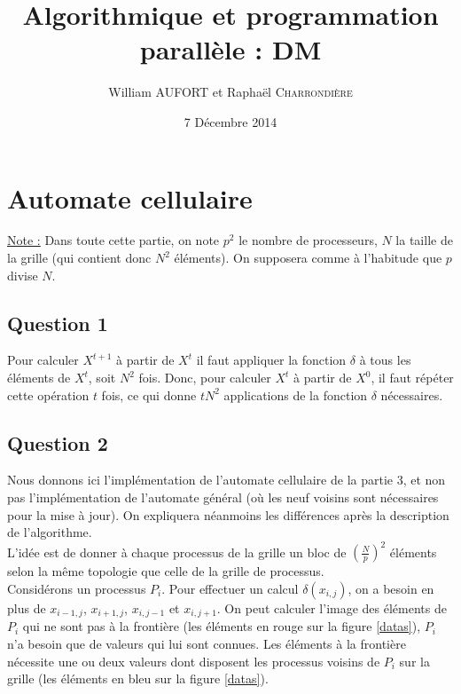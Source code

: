 \documentclass{article}
\title{Algorithmique et programmation parallèle : DM}
\author{William \textsc{AUFORT} et Raphaël \textsc{Charrondière}}
\date{7 Décembre 2014}
\newcommand{\X}[1]{{X}^{ #1 }}
\begin{document}
\maketitle

\section{Automate cellulaire}

\underline{Note :} Dans toute cette partie, on note $p^2$ le nombre de processeurs, $N$ la taille de la grille (qui contient donc $N^2$ éléments).
On supposera comme à l'habitude que $p$ divise $N$.

\subsection*{Question 1}

Pour calculer $\X{t+1}$ à partir de $\X{t}$ il faut appliquer la fonction $\delta$ à tous les éléments de $\X{t}$, soit $N^2$ fois.
Donc, pour calculer $\X{t}$ à partir de $\X{0}$, il faut répéter cette opération $t$ fois, ce qui donne $t N^2$ applications de la fonction $\delta$ nécessaires.

\subsection*{Question 2}

Nous donnons ici l'implémentation de l'automate cellulaire de la partie 3, et non pas l'implémentation de l'automate général (où les neuf voisins sont nécessaires pour la mise à jour). On expliquera néanmoins les différences après la description de l'algorithme. \\

L'idée est de donner à chaque processus de la grille un bloc de $\left( \frac{N}{p} \right) ^2$ éléments selon la même topologie que celle de la grille de processus. \\

Considérons un processus $P_i$. 
Pour effectuer un calcul $\delta(x_{i,j})$, on a besoin en plus de $x_{i-1,j}$, $x_{i+1,j}$, $x_{i,j-1}$ et $x_{i,j+1}$.
On peut calculer l'image des éléments de $P_i$ qui ne sont pas à la frontière (les éléments en rouge sur la figure \ref{datas}), $P_i$ n'a besoin que de valeurs qui lui sont connues.
Les éléments à la frontière nécessite une ou deux valeurs dont disposent les processus voisins de $P_i$ sur la grille (les éléments en bleu sur la figure \ref{datas}).
\end{document}
